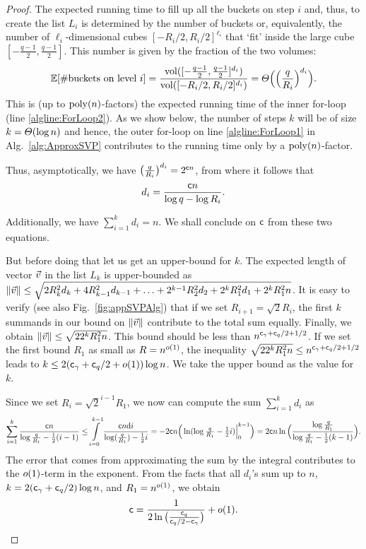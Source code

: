 \begin{proof}
	The expected running time to fill up all the buckets on step $i$ and, thus, to create the list $L_{i}$ is determined by the number of buckets or, equivalently, the number of $\ell_i$-dimensional cubes $[-R_i/2, R_i/2]^{\ell_i}$ that `fit' inside the large cube $[-\frac{q-1}{2}, \frac{q-1}{2}]$. This number is given by the fraction of the two volumes:
	\[
		\operatorname*{\mathbb{E}}[\#\text{buckets on level } i]= \frac{\operatorname{\mathrm{vol}}([-\frac{q-1}{2}, \frac{q-1}{2}]^{d_i})}{\operatorname{\mathrm{vol}}([-R_i/2, R_i/2]^{d_i})} = \varTheta \Big( \Big(\frac{q}{R_i}\Big)^{d_i}\Big).	
	\]
	This is (up to $\mathrm{poly}(n)$-factors) the expected running time of the inner for-loop (line \ref{algline:ForLoop2}).
	As we show below, the number of steps $k$ will be of size $k = \varTheta(\log n)$ and hence, the outer for-loop on line \ref{algline:ForLoop1} in Alg.~\ref{alg:ApproxSVP} contributes to the running time only by a $\mathrm{poly}(n)$-factor. 
	
	Thus, asymptotically, we have $\big(\frac{q}{R_i}\big)^{d_i} = 2^{\mathsf{c} n}$, from where it follows that 
	\begin{equation} \label{eq:d_i}
		d_i = \frac{\mathsf{c} n}{\log q - \log R_i}.
	\end{equation}
	
	Additionally, we have $\sum_{i=1}^k d_i = n$. We shall conclude on $\mathsf{c}$ from these two equations.
	
	But before doing that let us get an upper-bound for $k$. The expected length of vector $\vvec$ in the list $L_k$ is upper-bounded as $\| \vvec \| \leq \sqrt{2 R_k^2 d_k + 4 R_{k-1}^2 d_{k-1} + \ldots + 2^{k-1} R_2^2 d_2 + 2^k R_1^2 d_1 + 2^k R_1^2 n}$. It is easy to verify (see also Fig.~\ref{fig:appSVPAlg}) that if we set $R_{i+1} = \sqrt{2} R_i$, the first $k$ summands in our bound on $\|\vvec \|$ contribute to the total sum equally. Finally, we obtain $\| \vvec \| \leq \sqrt{2 2^{k} R_1^2 n}$. This bound should be less than $n^{\mathsf{c}_{\gamma} +\mathsf{c}_q/2 +1/2}$. If we set the first bound $R_1$ as small as $R=n^{o(1)}$, the inequality $\sqrt{2 2^{k} R_1^2 n} \leq n^{\mathsf{c}_{\gamma} +\mathsf{c}_q/2 +1/2}$ leads to $k \leq 2 (\mathsf{c}_{\gamma}+\mathsf{c}_q/2 + o(1)) \log n$. We take the upper bound as the value for $k$.  
	
	Since we set $R_i = \sqrt{2}^{i-1} R_1$, we now can compute the sum $\sum_{i=1}^k d_i$ as
	\[	
	\sum_{i=1}^{k} \frac{\mathsf{c} n}{\log \tfrac{q}{ R_1} - \tfrac{1}{2}(i-1)} \leq  \int\limits_{i=0}^{k-1} \frac{\mathsf{c} n  \mathrm{d} i}{\log (\tfrac{q}{ R_1}) - \tfrac{1}{2}i} = - 2\mathsf{c} n \Big( \ln(\log \tfrac{q}{ R_1} - \tfrac{1}{2}i) \Big|_0^{k-1} \Big) = 2\mathsf{c} n \ln \Big( \frac{\log \tfrac{q}{ R_1}}{\log \tfrac{q}{ R_1} - \tfrac{1}{2} (k-1)} \Big).
	\]
	The error that comes from approximating the sum by the integral contributes to the $o(1)$-term in the exponent.
	From the facts that all $d_i$'s sum up to $n$, $k=2 (\mathsf{c}_{\gamma}+\mathsf{c}_q/2)\log n$, and $R_1 = n^{o(1)}$, we obtain
	\[\mathsf{c} = \frac{1}{2 \ln \big( \tfrac{\mathsf{c}_q}{\mathsf{c}_q/2-\mathsf{c}_{\gamma}} \big)} +o(1).\]
	\vspace{-13pt}
\end{proof}

